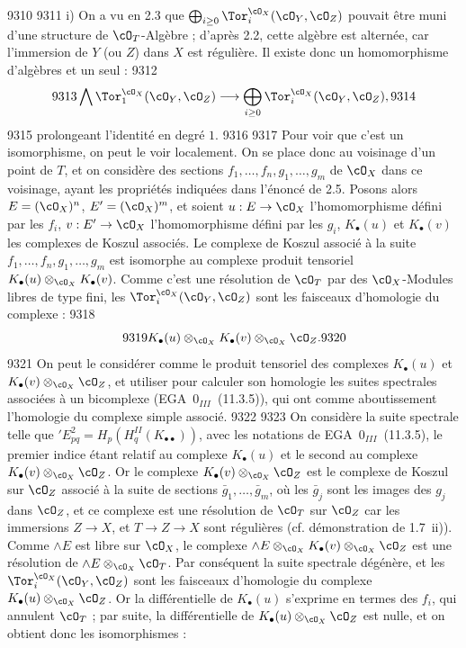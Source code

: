   9310	
  9311	i) On a vu en 2.3 que $\bigoplus_{i \geq 0} \Tor_i^{\cO_X}(\cO_Y, \cO_Z)$ pouvait \^etre muni d'une structure de $\cO_T$-Alg\`ebre ; d'apr\`es 2.2, cette alg\`ebre est altern\'ee, car l'immersion de $Y$ (ou $Z$) dans $X$ est r\'eguli\`ere. Il existe donc un homomorphisme d'alg\`ebres et un seul :
  9312	\begin{equation}\label{eq:2.5.1}
  9313	\bigwedge \Tor_1^{\cO_X}(\cO_Y, \cO_Z) \longrightarrow \bigoplus_{i \geq 0} \Tor_i^{\cO_X}(\cO_Y, \cO_Z),
  9314	\end{equation}
  9315	prolongeant l'identit\'e en degr\'e $1$.
  9316	
  9317	Pour voir que c'est un isomorphisme, on peut le voir localement. On se place donc au voisinage d'un point de $T$, et on consid\`ere des sections $f_1,\dots,f_n,g_1,\dots,g_m$ de $\cO_X$ dans ce voisinage, ayant les propri\'et\'es indiqu\'ees dans l'\'enonc\'e de 2.5. Posons alors $E = (\cO_X)^n$, $E' = (\cO_X)^m$, et soient $u: E \to \cO_X$ l'homomorphisme d\'efini par les $f_i$, $v: E' \to \cO_X$ l'homomorphisme d\'efini par les $g_i$, $K_{\bullet}(u)$ et $K_{\bullet}(v)$ les complexes de Koszul associ\'es. Le complexe de Koszul associ\'e \`a la suite $f_1,\dots,f_n,g_1,\dots,g_m$ est isomorphe au complexe produit tensoriel $K_{\bullet}(u) \otimes_{\cO_X} K_{\bullet}(v)$. Comme c'est une r\'esolution de $\cO_T$ par des $\cO_X$-Modules libres de type fini, les $\Tor_i^{\cO_X}(\cO_Y, \cO_Z)$ sont les faisceaux d'homologie du complexe :
  9318	\[
  9319	K_{\bullet}(u) \otimes_{\cO_X} K_{\bullet}(v) \otimes_{\cO_X} \cO_Z.
  9320	\]
  9321	On peut le consid\'erer comme le produit tensoriel des complexes $K_{\bullet}(u)$ et $K_{\bullet}(v) \otimes_{\cO_X} \cO_Z$, et utiliser pour calculer son homologie les suites spectrales associ\'ees \`a un bicomplexe (EGA~$0_{III}$~(11.3.5)), qui ont comme aboutissement l'homologie du complexe simple associ\'e.
  9322	
  9323	On consid\`ere la suite spectrale telle que $'E^2_{pq} = H_p(H_q^{II}(K_{\bullet\bullet}))$, avec les notations de EGA~$0_{III}$~(11.3.5), le premier indice \'etant relatif au complexe $K_{\bullet}(u)$ et le second au complexe $K_{\bullet}(v) \otimes_{\cO_X} \cO_Z$. Or le complexe $K_{\bullet}(v) \otimes_{\cO_X} \cO_Z$ est le complexe de Koszul sur $\cO_Z$ associ\'e \`a la suite de sections $\bar{g}_1,\dots,\bar{g}_m$, o\`u les $\bar{g}_j$ sont les images des $g_j$ dans $\cO_Z$, et ce complexe est une r\'esolution de $\cO_T$ sur $\cO_Z$ car les immersions $Z \to X$, et $T \to Z \to X$ sont r\'eguli\`eres (cf. d\'emonstration de 1.7~ii)). Comme $\wedge E$ est libre sur $\cO_X$, le complexe $\wedge E \otimes_{\cO_X} K_{\bullet}(v) \otimes_{\cO_X} \cO_Z$ est une r\'esolution de $\wedge E \otimes_{\cO_X} \cO_T$. Par cons\'equent la suite spectrale d\'eg\'en\`ere, et les $\Tor_i^{\cO_X}(\cO_Y, \cO_Z)$ sont les faisceaux d'homologie du complexe $K_{\bullet}(u) \otimes_{\cO_X} \cO_Z$. Or la diff\'erentielle de $K_{\bullet}(u)$ s'exprime en termes des $f_i$, qui annulent $\cO_T$ ; par suite, la diff\'erentielle de $K_{\bullet}(u) \otimes_{\cO_X} \cO_Z$ est nulle, et on obtient donc les isomorphismes :
